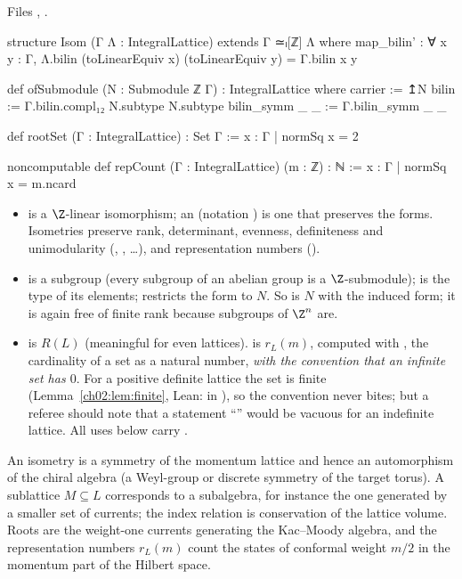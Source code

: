 \begin{definition}\label{ch02:def:ebemisc}
\end{definition}
\noindent Files , .
\begin{leancode}
structure Isom (Γ Λ : IntegralLattice) extends Γ ≃ₗ[ℤ] Λ where
  map_bilin' : ∀ x y : Γ, Λ.bilin (toLinearEquiv x) (toLinearEquiv y) = Γ.bilin x y

def ofSubmodule (N : Submodule ℤ Γ) : IntegralLattice where
  carrier := ↥N
  bilin := Γ.bilin.compl₁₂ N.subtype N.subtype
  bilin_symm _ _ := Γ.bilin_symm _ _

def rootSet (Γ : IntegralLattice) : Set Γ := {x : Γ | normSq x = 2}

noncomputable def repCount (Γ : IntegralLattice) (m : ℤ) : ℕ := {x : Γ | normSq x = m}.ncard
\end{leancode}
\begin{dictionary}
\begin{itemize}
\item {} is a $\Z$-linear isomorphism; an  (notation )
  is one that preserves the forms.  Isometries preserve rank, determinant, evenness,
  definiteness and unimodularity (, , \dots), and
  representation numbers ().
\item {} is a subgroup (every subgroup of an abelian group is a $\Z$-submodule);
   is the type of its elements;  restricts the form to
  $N$.  So  is $N$ with the induced form; it is again free of finite rank
  because subgroups of $\Z^n$ are.
\item {} is $R(L)$ (meaningful for even lattices).   is $r_L(m)$,
  computed with , the cardinality of a set as a natural number, \emph{with the
  convention that an infinite set has  $0$}.  For a positive definite lattice the set
  is finite (Lemma~\ref{ch02:lem:finite}, Lean:  in
  ), so the convention never bites; but a referee should note
  that a statement ``'' would be vacuous for an indefinite lattice.  All
  uses below carry .
\end{itemize}
\end{dictionary}
\begin{physics}
An isometry is a symmetry of the momentum lattice and hence an automorphism of the chiral algebra (a Weyl-group or discrete symmetry of the target torus). A sublattice $M\subseteq L$ corresponds to a subalgebra, for instance the one generated by a smaller set of currents; the index relation is conservation of the lattice volume. Roots are the weight-one currents generating the Kac--Moody algebra, and the representation numbers $r_L(m)$ count the states of conformal weight $m/2$ in the momentum part of the Hilbert space.
\end{physics}

